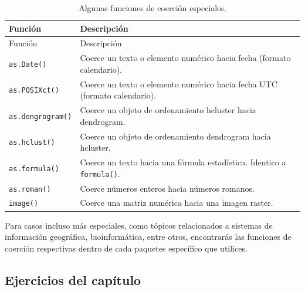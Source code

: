 \documentclass[
]{article}
\theoremstyle{definition}
\theoremstyle{definition}
\theoremstyle{definition}
\theoremstyle{definition}
\theoremstyle{remark}
\begin{document}
\begin{longtable}[]{@{}ll@{}}
\caption{\label{tab:unnamed-chunk-45}Algunas funciones de coerción especiales.}\tabularnewline
\toprule()
Función & Descripción \\
\midrule()
\endfirsthead
\toprule()
Función & Descripción \\
\midrule()
\endhead
\texttt{as.Date()} & Coerce un texto o elemento numérico hacia fecha (formato calendario). \\
\texttt{as.POSIXct()} & Coerce un texto o elemento numérico hacia fecha UTC (formato calendario). \\
\texttt{as.dengrogram()} & Coerce un objeto de ordenamiento hcluster hacia dendrogram. \\
\texttt{as.hclust()} & Coerce un objeto de ordenamiento dendrogram hacia hcluster. \\
\texttt{as.formula()} & Coerce un texto hacia una fórmula estadística. Identico a \texttt{formula()}. \\
\texttt{as.roman()} & Coerce números enteros hacia números romanos. \\
\texttt{image()} & Coerce una matriz numérica hacia una imagen raster. \\
\bottomrule()
\end{longtable}

\begin{rmdtip}
Para casos incluso más especiales, como tópicos relacionados a sistemas de información geográfica, bioinformática, entre otros, encontrarás las funciones de coerción respectivas dentro de cada paquetes específico que utilices.
\end{rmdtip}

\hypertarget{ejercicios-del-capuxedtulo-1}{%
\subsection{Ejercicios del capítulo}\label{ejercicios-del-capuxedtulo-1}}
\end{document}
